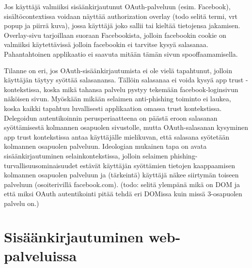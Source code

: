 \documentclass[finnish,gradu]{tktltiki}
\begin{document}


  Jos käyttäjä valmiiksi sisäänkirjautunut OAuth-palveluun (esim. Facebook), sisältöcontextissa voidaan näyttää authorization overlay (todo selitä termi, vrt popup ja piirrä kuva), jossa käyttäjä joko sallii tai kieltää tietojensa jakamisen. Overlay-sivu tarjoillaan suoraan Facebookista, jolloin facebookin cookie on valmiiksi käytettävissä jolloin facebookin ei tarvitse kysyä salasanaa. Pahantahtoinen applikaatio ei saavuta mitään tämän sivun spooffaamamisella.

  Tilanne on eri, jos OAuth-sisäänkirjautumista ei ole vielä tapahtunut, jolloin käyttäjän täytyy syöttää salasanansa. Tällöin salasanaa ei voida kysyä app trust -kontekstissa, koska mikä tahansa palvelu pystyy tekemään facebook-loginsivun näköisen sivun. Myöskään mikään selaimen anti-phishing toiminto ei laukea, koska kaikki tapahtuu luvallisesti applikaation omassa trust kontekstissa. Delegoidun autentikoinnin perusperiaatteena on päästä eroon salasanan syöttämisestä kolmannen osapuolen sivustolle, mutta OAuth-salasanan kysyminen app trust kontekstissa antaa käyttäjälle mielikuvan, että salasana syötetään kolmannen osapuolen palveluun. Ideologian mukainen tapa on avata sisäänkirjautuminen selainkontekstissa, jolloin selaimen phishing-turvallisuusominaisuudet estävät käyttäjän syöttämien tietojen kaappaamisen kolmannen osapuolen palveluun ja (tärkeintä) käyttäjä näkee siirtymän toiseen palveluun (osoiterivillä facebook.com). (todo: selitä ylempänä mikä on DOM ja että miksi OAuth autentikointi pitää tehdä eri DOMissa kuin missä 3-osapuolen palvelu on.)



\section{Sisäänkirjautuminen web-palveluissa} %
\label{sec:autentikoituminen_ja_web}
\end{document}
